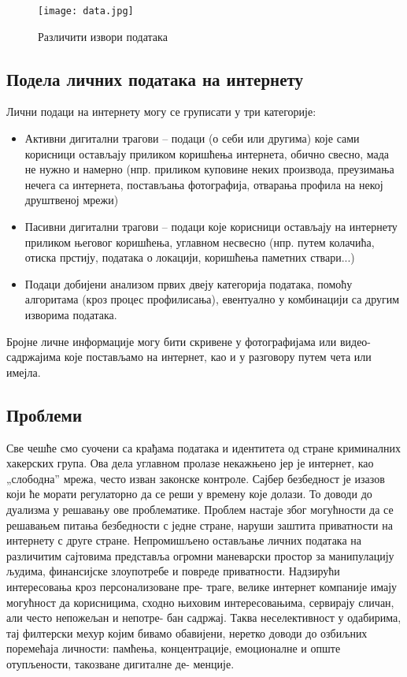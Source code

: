 \documentclass[a4paper]{article}
\begin{document}
\begin{figure}[hbt!]
\centering
\texttt{[image: data.jpg]}
\caption{Различити извори података }
\end{figure}

\subsection{Подела личних података на интернету}
\label{subsec:podnaslov1}

Лични подаци на интернету могу се груписати у три категорије:

\begin{itemize}
    \item Активни дигитални трагови – подаци (о себи или другима) које сами корисници остављају приликом коришћења интернета, обично свесно, мада не нужно и намерно (нпр. приликом куповине неких производа, преузимања нечега са интернета, постављања фотографија, отварања профила на некој друштвеној мрежи)
    \item Пасивни дигитални трагови – подаци које корисници остављају на интернету приликом његовог коришћења, углавном несвесно (нпр. путем колачића, отиска прстију, података о локацији, коришћења паметних ствари...)
    \item Подаци добијени анализом првих двеју категорија података, помоћу алгоритама (кроз процес профилисања), евентуално у комбинацији са другим изворима података.
\end{itemize}

Бројне личне информације могу бити скривене у фотографијама или видео-садржајима које постављамо на интернет, као и у разговору путем чета или имејла.



\subsection{Проблеми}
\label{subsec:podnaslov2}


Све чешће смо суочени са крађама података и идентитета од стране криминалних хакерских група. Ова дела углавном пролазе некажњено јер је интернет, као „слободна” мрежа, често изван законске контроле. Сајбер безбедност је изазов који ће морати регулаторно да се реши у времену које долази. То доводи до дуализма у решавању ове проблематике. Проблем настаје због могућности да се решавањем питања безбедности с једне стране, наруши заштита приватности на интернету с друге стране. Непромишљено остављање личних података на различитим сајтовима представља огромни маневарски простор за манипулацију људима, финансијске злоупотребе и повреде приватности. Надзирући интересовања кроз персонализоване пре-
траге, велике интернет компаније имају могућност да корисницима, сходно њиховим интересовањима, сервирају сличан, али често непожељан и непотре-
бан садржај. Таква неселективност у одабирима, тај филтерски мехур којим бивамо обавијени, неретко доводи до озбиљних поремећаја личности: памћења, концентрације, емоционалне и опште отупљености, такозване дигиталне де-
менције.
\end{document}
